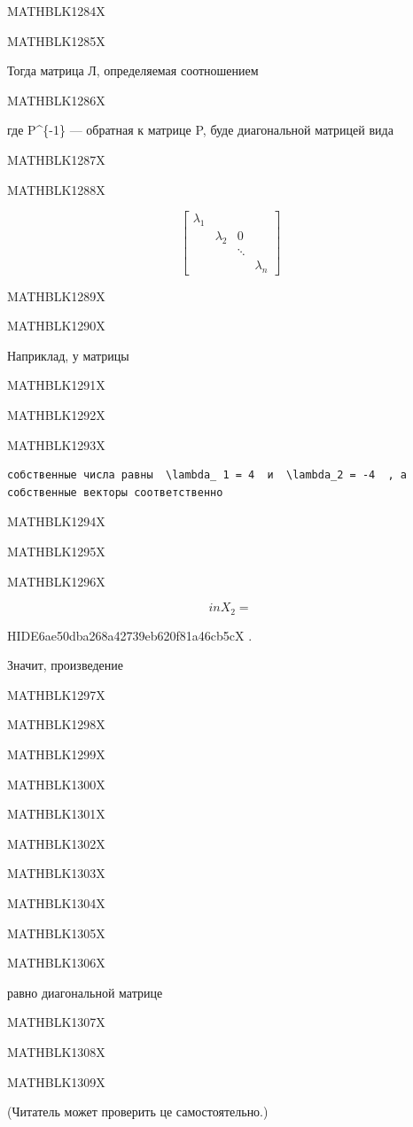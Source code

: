 \documentclass[
  ukrainian,
]{article}
\begin{document}
MATHBLK1284X

MATHBLK1285X

Тогда матрица Л, определяемая соотношением

MATHBLK1286X

где P\^{}\{-1\} --- обратная к матрице P, буде диагональной матрицей
вида

MATHBLK1287X

MATHBLK1288X

\[
\begin{bmatrix} \lambda_1 & & & \\ & \lambda_2 & 0 & \\ & & \ddots & \\ & & & \lambda_n \end{bmatrix}
\]

MATHBLK1289X

MATHBLK1290X

Наприклад, у матрицы

MATHBLK1291X

MATHBLK1292X

MATHBLK1293X

\begin{verbatim}
собственные числа равны  \lambda_ 1 = 4  и  \lambda_2 = -4  , а собственные векторы соответственно
\end{verbatim}

MATHBLK1294X

MATHBLK1295X

MATHBLK1296X

\[
in  X_2 =
\]

HIDE6ae50dba268a42739eb620f81a46cb5cX .

Значит, произведение

MATHBLK1297X

MATHBLK1298X

MATHBLK1299X

MATHBLK1300X

MATHBLK1301X

MATHBLK1302X

MATHBLK1303X

MATHBLK1304X

MATHBLK1305X

MATHBLK1306X

равно диагональной матрице

MATHBLK1307X

MATHBLK1308X

MATHBLK1309X

(Читатель может проверить це самостоятельно.)
\end{document}
